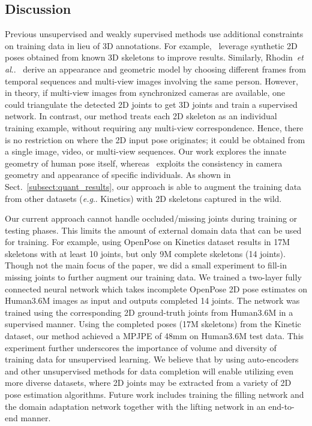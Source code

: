 \documentclass[10pt,twocolumn,letterpaper]{article}
\makeatletter
\DeclareRobustCommand\onedot{\futurelet\@let@token\@onedot}
\def\@onedot{\ifx\@let@token.\else.\null\fi\xspace}
\def\eg{\emph{e.g}\onedot} \def\Eg{\emph{E.g}\onedot}
\def\etal{\emph{et al}\onedot}
\makeatother
\begin{document}
 \subsection{Discussion}
Previous unsupervised and weakly supervised methods use additional constraints on training data in lieu of 3D annotations. For example,~\cite{ZedNet_2018_ECCVW, Yasin_2016_CVPR} leverage synthetic 2D poses obtained from known 3D skeletons to improve results. Similarly, Rhodin~\etal~\cite{Rhodin_2018_ECCV} derive an appearance and geometric model by choosing different frames from temporal sequences and multi-view images involving the same person. However, in theory, if multi-view images from synchronized cameras are available, one could triangulate the detected 2D joints to get 3D joints and train a supervised network. In contrast, our method treats each 2D skeleton as an individual training example, without requiring any multi-view correspondence. Hence, there is no restriction on where the 2D input pose originates; it could be obtained from a single image, video, or multi-view sequences. Our work explores the innate geometry of human pose itself, whereas~\cite{Rhodin_2018_ECCV} exploits the consistency in camera geometry and appearance of specific individuals. As shown in Sect.~\ref{subsect:quant_results}, our approach is able to augment the training data from other datasets (\eg Kinetics) with 2D skeletons captured in the wild.

Our current approach cannot handle occluded/missing joints during training or testing phases. This limits the amount of external domain data that can be used for training. For example, using OpenPose on Kinetics dataset results in 17M skeletons with at least 10 joints, but only 9M complete skeletons (14 joints). Though not the main focus of the paper, we did a small experiment to fill-in missing joints to further augment our training data. We trained a two-layer fully connected neural network which takes incomplete OpenPose 2D pose estimates on Human3.6M images as input and outputs completed 14 joints. The network was trained using the corresponding 2D ground-truth joints from Human3.6M in a supervised manner. Using the completed poses (17M skeletons) from the Kinetic dataset, our method achieved a MPJPE of 48mm on Human3.6M test data. This experiment further underscores the importance of volume and diversity of training data for unsupervised learning. We believe that by using auto-encoders and other unsupervised methods for data completion will enable utilizing even more diverse datasets, where 2D joints may be extracted from a variety of 2D pose estimation algorithms. Future work includes training the filling network and the domain adaptation network together with the lifting network in an end-to-end manner.
\end{document}
